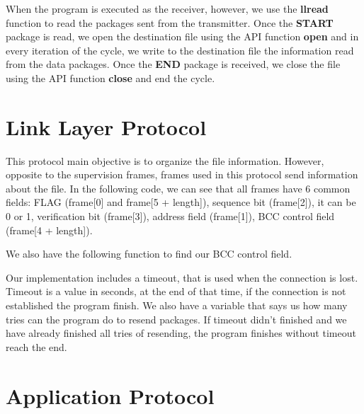 \documentclass[a4paper]{article}
\begin{document}
When the program is executed as the receiver, however, we use the \textbf{llread} function to read the packages sent from the transmitter. Once the \textbf{START} package is read, we open the destination file using the API function \textbf{open} and in every iteration of the cycle, we write to the destination file the information read from the data packages. Once the \textbf{END} package is received, we close the file using the API function \textbf{close} and end the cycle.

\section{Link Layer Protocol}

This protocol main objective is to organize the file information. However, opposite to the supervision frames, frames used in this protocol send information about the file. In the following code, we can see that all frames have 6 common fields: FLAG (frame[0] and frame[5 + length]), sequence bit (frame[2]), it can be 0 or 1, verification bit (frame[3]), address field (frame[1]), BCC control field (frame[4 + length]).


We also have the following function to find our BCC control field.


Our implementation includes a timeout, that is used when the connection is lost. Timeout is a value in seconds, at the end of that time, if the connection is not established the program finish. We also have a variable that says us how many tries can the program do to resend packages. If timeout didn't finished and we have already finished all tries of resending, the program finishes without timeout reach the end.


\section{Application Protocol}
\end{document}
